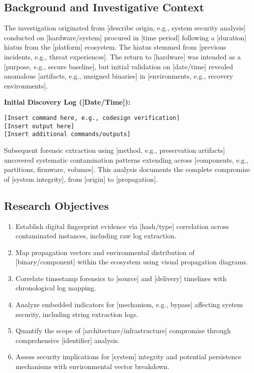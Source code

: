 \documentclass[12pt,a4paper]{article}
\begin{document}
\subsection{Background and Investigative Context}
The investigation originated from [describe origin, e.g., system security analysis] conducted on [hardware/system] procured in [time period] following a [duration] hiatus from the [platform] ecosystem. The hiatus stemmed from [previous incidents, e.g., threat experiences]. The return to [hardware] was intended as a [purpose, e.g., secure baseline], but initial validation on [date/time] revealed anomalous [artifacts, e.g., unsigned binaries] in [environments, e.g., recovery environments].

\textbf{Initial Discovery Log ([Date/Time]):}
\begin{lstlisting}[style=terminal, caption={Initial Verification Failure}]
[Insert command here, e.g., codesign verification]
[Insert output here]
[Insert additional commands/outputs]
\end{lstlisting}

Subsequent forensic extraction using [method, e.g., preservation artifacts] uncovered systematic contamination patterns extending across [components, e.g., partitions, firmware, volumes]. This analysis documents the complete compromise of [system integrity], from [origin] to [propagation].

\subsection{Research Objectives}
\begin{enumerate}
    \item Establish digital fingerprint evidence via [hash/type] correlation across contaminated instances, including raw log extraction.
    \item Map propagation vectors and environmental distribution of [binary/component] within the ecosystem using visual propagation diagrams.
    \item Correlate timestamp forensics to [source] and [delivery] timelines with chronological log mapping.
    \item Analyze embedded indicators for [mechanism, e.g., bypass] affecting system security, including string extraction logs.
    \item Quantify the scope of [architecture/infrastructure] compromise through comprehensive [identifier] analysis.
    \item Assess security implications for [system] integrity and potential persistence mechanisms with environmental vector breakdown.
\end{enumerate}
\end{document}

